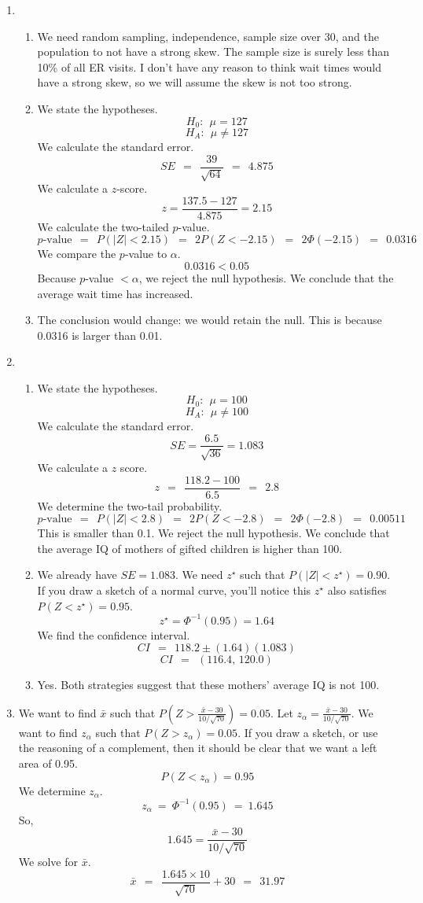 \documentclass[12pt,letterpaper]{article}
\begin{document}
\begin{enumerate}
\item \begin{enumerate}
\item We need random sampling, independence, sample size over 30, and the population to not have a strong skew. The sample size is surely less than 10\% of all ER visits. I don't have any reason to think wait times would have a strong skew, so we will assume the skew is not too strong.
\item We state the hypotheses.
$$H_0: ~~ \mu = 127 $$
$$H_A: ~~ \mu \ne 127 $$
We calculate the standard error.
$$SE ~~=~~ \frac{39}{\sqrt{64}} ~~=~~ 4.875 $$
We calculate a $z$-score.
$$z = \frac{137.5-127}{4.875} = 2.15 $$
We calculate the two-tailed $p$-value.
$$p\text{-value} ~~=~~ P(|Z|<2.15) ~~=~~ 2P(Z<-2.15) ~~=~~ 2\Phi(-2.15) ~~=~~ 0.0316 $$
We compare the $p$-value to $\alpha$.
$$0.0316 < 0.05 $$
Because $p$-value $< \alpha$, we reject the null hypothesis. We conclude that the average wait time has increased.
\item The conclusion would change: we would retain the null. This is because 0.0316 is larger than 0.01.
\end{enumerate}

\item \begin{enumerate}
\item We state the hypotheses.
$$H_0:~~\mu = 100$$
$$H_A:~~\mu \ne 100$$
We calculate the standard error.
$$SE = \frac{6.5}{\sqrt{36}} = 1.083 $$
We calculate a $z$ score.
$$z ~~=~~ \frac{118.2-100}{6.5} ~~=~~ 2.8 $$
We determine the two-tail probability.
$$p\text{-value} ~~=~~ P(|Z|<2.8) ~~=~~ 2P(Z<-2.8) ~~=~~ 2\Phi(-2.8) ~~=~~ 0.00511 $$
This is smaller than 0.1. We reject the null hypothesis. We conclude that the average IQ of mothers of gifted children is higher than 100.
\item We already have $SE=1.083$. We need $z^\star$ such that $P(|Z|<z^\star) = 0.90$. If you draw a sketch of a normal curve, you'll notice this $z^\star$ also satisfies $P(Z<z^\star) = 0.95$.
$$z^\star = \Phi^{-1}(0.95) = 1.64 $$
We find the confidence interval.
$$CI ~~=~~ 118.2 \pm (1.64)(1.083) $$
$$CI ~~=~~ (116.4,\,120.0) $$
\item Yes. Both strategies suggest that these mothers' average IQ is not 100.
\end{enumerate}

\item We want to find $\bar{x}$ such that $P\left(Z>\frac{\bar{x}-30}{10/\sqrt{70}}\right)=0.05$. Let $z_{\alpha} = \frac{\bar{x}-30}{10/\sqrt{70}}$. We want to find $z_{\alpha}$ such that $P\left(Z>z_{\alpha}\right)=0.05$. If you draw a sketch, or use the reasoning of a complement, then it should be clear that we want a left area of 0.95.
$$P(Z<z_{\alpha}) = 0.95 $$
We determine $z_{\alpha}$.
$$z_{\alpha} ~=~ \Phi^{-1}(0.95) ~=~ 1.645 $$
So,
$$1.645 = \frac{\bar{x}-30}{10/\sqrt{70}} $$
We solve for $\bar{x}$.
$$\bar{x} ~~=~~ \frac{1.645 \times 10}{\sqrt{70}} + 30 ~~=~~ 31.97$$


\end{enumerate}
\end{document}
